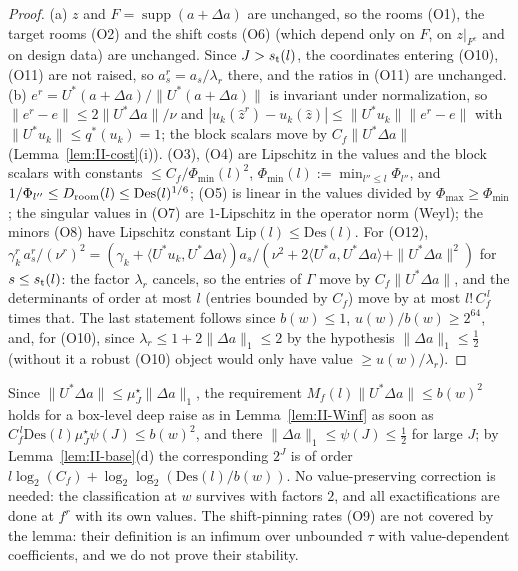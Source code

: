 \documentclass[10pt]{amsart}
\theoremstyle{definition}
\theoremstyle{remark}
\newcommand{\supp}{\operatorname{supp}}
\newcommand{\zh}{\hat z}
\newcommand{\ip}[2]{\langle #1,#2\rangle}
\begin{document}
\begin{proof}
(a) $z$ and $F=\supp(a+\Delta a)$ are unchanged, so the rooms (O1), the
target rooms (O2) and the shift costs (O6) (which depend only on $F$, on
$z|_{F^c}$ and on design data) are unchanged.  Since $J>s_{\rm t}(l)$, the
coordinates entering (O10), (O11) are not raised, so $a^r_s=a_s/\lambda_r$
there, and the ratios in (O11) are unchanged.
(b) $e^r=U^*(a+\Delta a)/\|U^*(a+\Delta a)\|$ is invariant under
normalization, so $\|e^r-e\|\le2\|U^*\Delta a\|/\nu$ and $|u_k(\zh^r)-
u_k(\zh)|\le\|U^*u_k\|\|e^r-e\|$ with $\|U^*u_k\|\le q^*(u_k)=1$; the block
scalars move by $C_f\|U^*\Delta a\|$ (Lemma~\ref{lem:II-cost}(i)).  (O3),
(O4) are Lipschitz in the values and the block scalars with constants
$\le C_f/\Phi_{\min}(l)^2$, $\Phi_{\min}(l):=\min_{l''\le l}\Phi_{l''}$, and
$1/\Phi_{l''}\le D_{\rm room}(l)\le\mathrm{Des}(l)^{1/6}$; (O5) is linear in the
values divided by $\Phi_{\max}\ge\Phi_{\min}$; the singular values in (O7) are
$1$-Lipschitz in the operator norm (Weyl); the minors (O8) have Lipschitz
constant $\mathrm{Lip}(l)\le\mathrm{Des}(l)$.  For (O12), $\gamma^r_k\,a^r_s/
(\nu^r)^2=(\gamma_k+\ip{U^*u_k}{U^*\Delta a})a_s/(\nu^2+2\ip{U^*a}{U^*\Delta a}+
\|U^*\Delta a\|^2)$ for $s\le s_{\rm t}(l)$: the factor $\lambda_r$ cancels, so the
entries of $\Gamma$ move by $C_f\|U^*\Delta a\|$, and the determinants of order
at most $l$ (entries bounded by $C_f$) move by at most $l!\,C_f^{\,l}$ times
that.  The last statement follows since $b(w)\le1$, $u(w)/b(w)\ge2^{64}$,
and, for (O10), since $\lambda_r\le1+2\|\Delta a\|_1\le2$ by the hypothesis
$\|\Delta a\|_1\le\frac12$ (without it a robust (O10) object would only have
value $\ge u(w)/\lambda_r$).
\end{proof}

Since $\|U^*\Delta a\|\le\mu^\star_J\|\Delta a\|_1$, the requirement
$M_f(l)\|U^*\Delta a\|\le b(w)^2$ holds for a box-level deep raise as in
Lemma~\ref{lem:II-Winf} as soon as $C_f^{\,l}\mathrm{Des}(l)\mu^\star_J\psi(J)\le
b(w)^2$, and there $\|\Delta a\|_1\le\psi(J)\le\frac12$ for large $J$; by Lemma~\ref{lem:II-base}(d) the corresponding $2^J$ is of order
$l\log_2(C_f)+\log_2\log_2(\mathrm{Des}(l)/b(w))$.  No value-preserving
correction is needed: the classification at $w$ survives with factors $2$,
and all exactifications are done at $f^r$ with its own values.  The
shift-pinning rates (O9) are not covered by the lemma: their definition is an
infimum over unbounded $\tau$ with value-dependent coefficients, and we do
not prove their stability.
\end{document}

